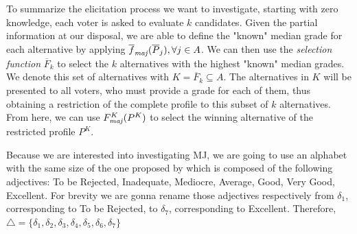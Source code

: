 To summarize the elicitation process we want to investigate, starting with zero knowledge, each voter is asked to evaluate $k$ candidates. Given the partial information at our disposal, we are able to define the "known" median grade for each alternative by applying $\fmajbar(\Pbar_{j}), \forall j\in A$. We can then use the \emph{selection function} $\overline{F}_k$ to select the $k$ alternatives with the highest "known" median grades. We denote this set of alternatives with $K=\overline{F}_k\subseteq A$. The alternatives in $K$ will be presented to all voters, who must provide a grade for each of them, thus obtaining a restriction of the complete profile to this subset of $k$ alternatives. From here, we can use $\Fmaj[K](P^K)$ to select the winning alternative of the restricted profile $P^K$.

%
%
%

\begin{remark}
	Because we are interested into investigating \acs{MJ}, we are going to use an alphabet with the same size of the one proposed by \citet{Balinski2011} which is composed of the following adjectives: To be Rejected, Inadequate, Mediocre, Average, Good, Very Good, Excellent. For brevity we are gonna rename those adjectives respectively from $\delta_1$, corresponding to To be Rejected, to $\delta_7$, corresponding to Excellent. Therefore, $\triangle=\{\delta_1,\delta_2, \delta_3,\delta_4,\delta_5,\delta_6,\delta_7\}$ 
\end{remark}

